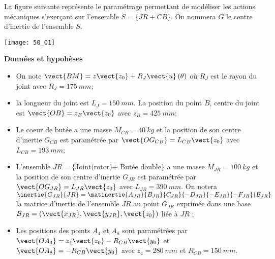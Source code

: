\normaltrue \difficilefalse \tdifficilefalse
\correctionfalse


\setcounter{question}{0}
\ifcorrection
\else
{}
\fi




\ifprof
\else
La figure suivante représente le paramétrage permettant de modéliser les actions mécaniques
s’exerçant sur l’ensemble $S=\{JR+CB\}$. On nommera $G$ le centre d’inertie de l’ensemble
$S$.


\begin{marginfigure}
\centering
\texttt{[image: 50\_01]}
\end{marginfigure}
\fi

\textbf{Données et hypohèses}

\begin{itemize}
\item On note $\vect{BM}=z\vect{z_0}+R_J\vect{u}\left(\theta\right)$ où $R_J$ est le rayon du joint avec $R_J = \SI{175}{mm}$;
\item la longueur du joint est $L_J = \SI{150}{mm}$. La position du point $B$, centre du joint est $\vect{OB}=z_B\vect{z_0}$ avec $z_B = \SI{425}{mm}$;
\item Le coeur de butée a une masse $M_{CB} = \SI{40}{kg}$ et la position de son centre d’inertie $G_{CB}$ est paramétrée par $\vect{OG_{CB}}= L_{CB}\vect{z_0}$ avec $L_{CB} = \SI{193}{mm}$;
\item L’ensemble $JR=\{\text{Joint(rotor)+ Butée double}\}$ a une masse $M_{JR} = \SI{100}{kg}$ et la
position de son centre d’inertie $G_{JR}$ est paramétrée par $\vect{OG_{JR}}=L_{JR}\vect{z_0}$ avec $L_{JR}=
\SI{390}{mm}$. On notera $\inertie{G_{JR}}{JR} = \matinertie{A_{JR}}{B_{JR}}{C_{JR}}{-D_{JR}}{-E_{JR}}{-F_{JR}}{\mathcal{B}_{JR}}$ la matrice d’inertie de l’ensemble $JR$ au point $G_{JR}$ exprimée dans une base $\mathcal{B}_{JR} = \left(\vect{x_{JR}},\vect{y_{JR}},\vect{z_{0}}\right)$ liée à $JR$ ;
\item Les positions des points $A_4$ et $A_8$ sont paramétrées par $\vect{OA_4} = z_4\vect{z_0}-R_{CB}\vect{y_0}$ et
$\vect{OA_8}=-R_{CB}\vect{y_0}$ avec $z_4 = \SI{280}{mm}$ et $R_{CB}=\SI{150}{mm}$.
\end{itemize}



